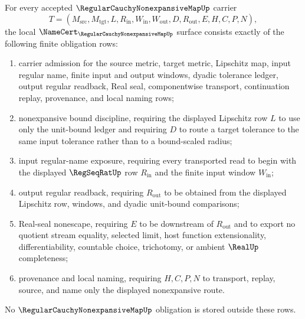 \begin{theorem}
\label{thm:regular-cauchy-nonexpansive-map-namecert-obligations}
For every accepted $\RegularCauchyNonexpansiveMapUp$ carrier
$$
T=(M_{\mathrm{src}},M_{\mathrm{tgt}},L,R_{\mathrm{in}},W_{\mathrm{in}},W_{\mathrm{out}},D,R_{\mathrm{out}},E,H,C,P,N),
$$
the local $\NameCert_{\RegularCauchyNonexpansiveMapUp}$ surface consists exactly of the following finite obligation rows:
\begin{enumerate}
\item carrier admission for the source metric, target metric, Lipschitz map, input regular name, finite input and output windows, dyadic tolerance ledger, output regular readback, Real seal, componentwise transport, continuation replay, provenance, and local naming rows;
\item nonexpansive bound discipline, requiring the displayed Lipschitz row $L$ to use only the unit-bound ledger and requiring $D$ to route a target tolerance to the same input tolerance rather than to a bound-scaled radius;
\item input regular-name exposure, requiring every transported read to begin with the displayed $\RegSeqRatUp$ row $R_{\mathrm{in}}$ and the finite input window $W_{\mathrm{in}}$;
\item output regular readback, requiring $R_{\mathrm{out}}$ to be obtained from the displayed Lipschitz row, windows, and dyadic unit-bound comparisons;
\item Real-seal nonescape, requiring $E$ to be downstream of $R_{\mathrm{out}}$ and to export no quotient stream equality, selected limit, host function extensionality, differentiability, countable choice, trichotomy, or ambient $\RealUp$ completeness;
\item provenance and local naming, requiring $H,C,P,N$ to transport, replay, source, and name only the displayed nonexpansive route.
\end{enumerate}
No $\RegularCauchyNonexpansiveMapUp$ obligation is stored outside these rows.
\end{theorem}
